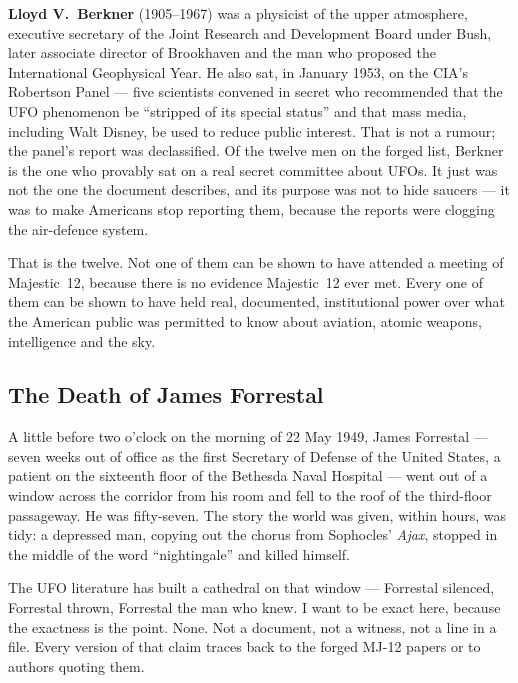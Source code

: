 \textbf{Lloyd V.~Berkner} (1905--1967) was a physicist of the upper atmosphere, executive secretary
of the Joint Research and Development Board under Bush, later associate director of Brookhaven and
the man who proposed the International Geophysical Year. He also sat, in January 1953, on the CIA's
Robertson Panel --- five scientists convened in secret who recommended that the UFO phenomenon be
``stripped of its special status'' and that mass media, including Walt Disney, be used to reduce
public interest. That is not a rumour; the panel's report was declassified. Of the twelve men on
the forged list, Berkner is the one who provably sat on a real secret committee about UFOs. It just
was not the one the document describes, and its purpose was not to hide saucers --- it was to make
Americans stop reporting them, because the reports were clogging the air-defence system.

That is the twelve. Not one of them can be shown to have attended a meeting of Majestic~12,
because there is no evidence Majestic~12 ever met. Every one of them can be shown to have held
real, documented, institutional power over what the American public was permitted to know about
aviation, atomic weapons, intelligence and the sky. 

\subsection{The Death of James Forrestal}\label{sec:forrestal}

A little before two o'clock on the morning of 22 May 1949, James Forrestal --- seven weeks out of
office as the first Secretary of Defense of the United States, a patient on the sixteenth floor of
the Bethesda Naval Hospital --- went out of a window across the corridor from his room and fell to
the roof of the third-floor passageway. He was fifty-seven. The story the world was given, within
hours, was tidy: a depressed man, copying out the chorus from Sophocles' \emph{Ajax}, stopped in
the middle of the word ``nightingale'' and killed himself.

The UFO literature has built a cathedral on that window --- Forrestal silenced, Forrestal thrown,
Forrestal the man who knew. I want to be exact here, because the exactness is the point.
 None.
Not a document, not a witness, not a line in a file. Every version of that claim traces back to
the forged MJ-12 papers or to authors quoting them.

